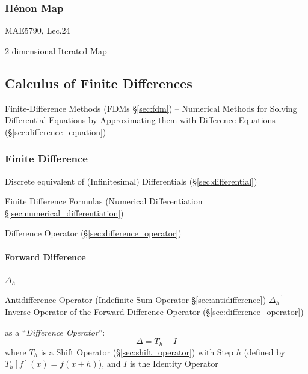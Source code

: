 {\subsubsection{H\'enon Map}\label{sec:henon_map}

MAE5790, Lec.24

2-dimensional Iterated Map



\subsection{Calculus of Finite Differences}
\label{sec:finite_differences_calculus}

\fist Finite-Difference Methods (FDMs \S\ref{sec:fdm}) -- Numerical Methods for
Solving Differential Equations by Approximating them with Difference Equations
(\S\ref{sec:difference_equation})



\subsubsection{Finite Difference}\label{sec:finite_difference}

Discrete equivalent of (Infinitesimal) Differentials (\S\ref{sec:differential})

Finite Difference Formulas (Numerical Differentiation
\S\ref{sec:numerical_differentiation})

Difference Operator (\S\ref{sec:difference_operator})



\paragraph{Forward Difference}\label{sec:forward_difference}\hfill

$\Delta_h$

\fist Antidifference Operator (Indefinite Sum Operator
\S\ref{sec:antidifference}) $\Delta^{-1}_h$ -- Inverse Operator of the Forward
Difference Operator (\S\ref{sec:difference_operator})

as a ``\emph{Difference Operator}'':
\[
  \Delta = T_h - I
\]
where $T_h$ is a Shift Operator (\S\ref{sec:shift_operator}) with Step $h$
(defined by $T_h[f](x) = f(x + h)$), and $I$ is the Identity Operator



}
